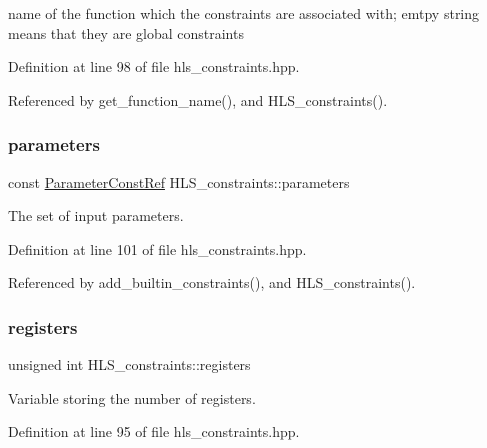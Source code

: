 name of the function which the constraints are associated with; emtpy string means that they are global constraints 



Definition at line 98 of file hls\+\_\+constraints.\+hpp.



Referenced by get\+\_\+function\+\_\+name(), and H\+L\+S\+\_\+constraints().

\mbox{\label{classHLS__constraints_a64ee4139f8b4f84b0ea40de253b3e3c5}} 
\subsubsection{\texorpdfstring{parameters}{parameters}}
{\footnotesize\ttfamily const \hyperlink{Parameter_8hpp_a37841774a6fcb479b597fdf8955eb4ea}{Parameter\+Const\+Ref} H\+L\+S\+\_\+constraints\+::parameters\hspace{0.3cm}{\ttfamily [private]}}



The set of input parameters. 



Definition at line 101 of file hls\+\_\+constraints.\+hpp.



Referenced by add\+\_\+builtin\+\_\+constraints(), and H\+L\+S\+\_\+constraints().

\mbox{\label{classHLS__constraints_ae36d9fde4e292cd2a651501706ec2325}} 
\subsubsection{\texorpdfstring{registers}{registers}}
{\footnotesize\ttfamily unsigned int H\+L\+S\+\_\+constraints\+::registers\hspace{0.3cm}{\ttfamily [private]}}



Variable storing the number of registers. 



Definition at line 95 of file hls\+\_\+constraints.\+hpp.



